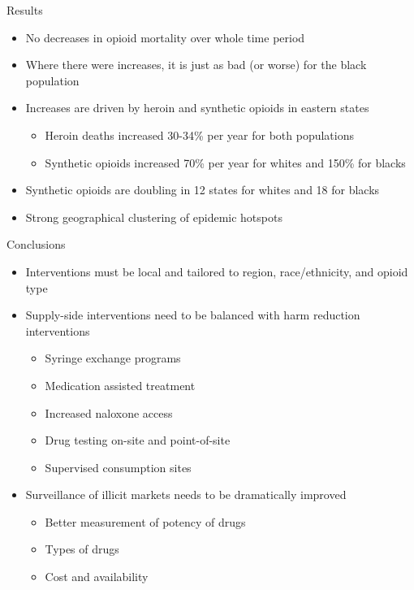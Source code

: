 \documentclass[ignorenonframetext,compress]{beamer}
\providecommand{\tightlist}{%
  \setlength{\itemsep}{0pt}\setlength{\parskip}{0pt}}
\begin{document}
\begin{frame}{Results}

\begin{itemize}[<+->]
\tightlist
\item
  No decreases in opioid mortality over whole time period
\item
  Where there were increases, it is just as bad (or worse) for the black
  population
\item
  Increases are driven by heroin and synthetic opioids in eastern states

  \begin{itemize}[<+->]
  \tightlist
  \item
    Heroin deaths increased 30-34\% per year for both populations
  \item
    Synthetic opioids increased 70\% per year for whites and 150\% for
    blacks
  \end{itemize}
\item
  Synthetic opioids are doubling in 12 states for whites and 18 for
  blacks
\item
  Strong geographical clustering of epidemic hotspots
\end{itemize}

\end{frame}

\begin{frame}{Conclusions}

\begin{itemize}[<+->]
\tightlist
\item
  Interventions must be local and tailored to region, race/ethnicity,
  and opioid type
\item
  Supply-side interventions need to be balanced with harm reduction
  interventions

  \begin{itemize}[<+->]
  \tightlist
  \item
    Syringe exchange programs
  \item
    Medication assisted treatment
  \item
    Increased naloxone access
  \item
    Drug testing on-site and point-of-site
  \item
    Supervised consumption sites
  \end{itemize}
\item
  Surveillance of illicit markets needs to be dramatically improved

  \begin{itemize}[<+->]
  \tightlist
  \item
    Better measurement of potency of drugs
  \item
    Types of drugs
  \item
    Cost and availability
  \end{itemize}
\end{itemize}

\end{frame}
\end{document}
